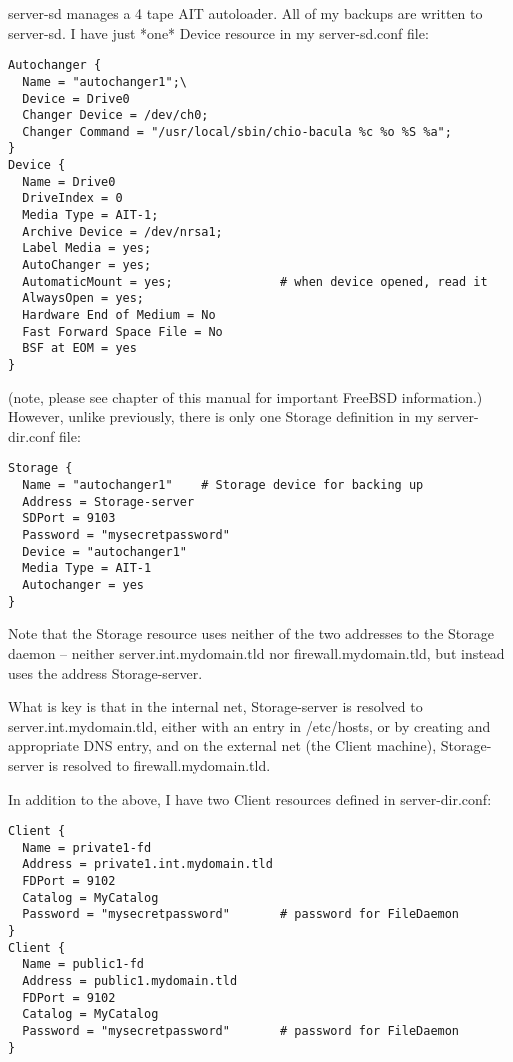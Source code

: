 server-sd manages a 4 tape AIT autoloader. All of my backups are written to
server-sd. I have just *one* Device resource in my server-sd.conf file:

\footnotesize
\begin{verbatim}
Autochanger {
  Name = "autochanger1";\
  Device = Drive0
  Changer Device = /dev/ch0;
  Changer Command = "/usr/local/sbin/chio-bacula %c %o %S %a";
}
Device {
  Name = Drive0
  DriveIndex = 0
  Media Type = AIT-1;
  Archive Device = /dev/nrsa1;
  Label Media = yes;
  AutoChanger = yes;
  AutomaticMount = yes;               # when device opened, read it
  AlwaysOpen = yes;
  Hardware End of Medium = No
  Fast Forward Space File = No
  BSF at EOM = yes
}
\end{verbatim}
\normalsize

(note, please see
 chapter of this manual
for important FreeBSD information.) However, unlike previously, there
is only one Storage definition in my server-dir.conf file:

\footnotesize
\begin{verbatim}
Storage {
  Name = "autochanger1"    # Storage device for backing up
  Address = Storage-server
  SDPort = 9103
  Password = "mysecretpassword"
  Device = "autochanger1"
  Media Type = AIT-1
  Autochanger = yes
}
\end{verbatim}
\normalsize

Note that the Storage resource uses neither of the two addresses to
the Storage daemon -- neither server.int.mydomain.tld nor
firewall.mydomain.tld, but instead uses the address Storage-server.

What is key is that in the internal net, Storage-server is resolved
to server.int.mydomain.tld, either with an entry in /etc/hosts, or by
creating and appropriate DNS entry, and on the external net (the Client
machine), Storage-server is resolved to firewall.mydomain.tld.


In addition to the above, I have two Client resources defined in
server-dir.conf:

\footnotesize
\begin{verbatim}
Client {
  Name = private1-fd
  Address = private1.int.mydomain.tld
  FDPort = 9102
  Catalog = MyCatalog
  Password = "mysecretpassword"       # password for FileDaemon
}
Client {
  Name = public1-fd
  Address = public1.mydomain.tld
  FDPort = 9102
  Catalog = MyCatalog
  Password = "mysecretpassword"       # password for FileDaemon
}
\end{verbatim}
\normalsize

